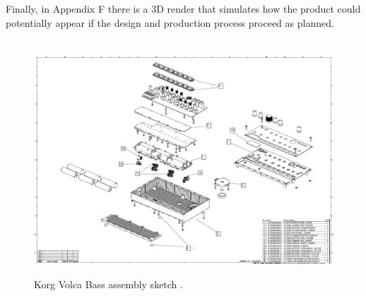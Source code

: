 \documentclass[]{article}
\begin{document}
            Finally, in Appendix F there is a 3D render that simulates how the product could potentially appear if the design and production process proceed as planned.
            
            \pagebreak
            

        \begin{appendices}
            \appendix
            \begin{landscape}
                \begin{figure}[h!]
                \textbf{}\\ %
                \includegraphics[width=\linewidth]{korg-volca-bass-assembly-sketch.png}
                    \caption{Korg Volca Bass assembly sketch \cite{KORG2013}.}
                \end{figure}
            \end{landscape}
            \pagebreak
            

\end{appendices}
\end{document}

